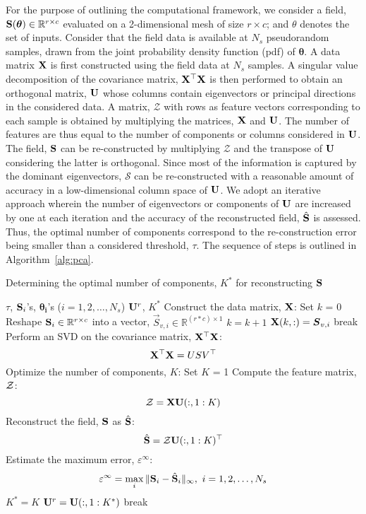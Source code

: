 For the purpose of outlining the computational framework, we consider a field,
$\mathbf{{S}}(\bm{\theta})\in\mathbb{R}^{r\times c}$ evaluated on a 2-dimensional mesh of size $r\times c$;
and $\theta$ denotes the set of inputs. Consider that the field data is available at $N_s$ pseudorandom
samples, drawn from the joint probability density function (pdf) of $\bm{\theta}$. A data matrix $\mathbf{{X}}$ is
first constructed using the field data at $N_s$ samples. A singular value decomposition of the covariance
matrix, $\mathbf{{X^\top X}}$ is then performed to obtain an orthogonal matrix, $\mathbf{{U}}$ whose columns 
contain eigenvectors or principal directions in the considered data. A matrix, $\mathcal{Z}$ with 
rows as feature vectors corresponding to each
sample is obtained by multiplying the matrices, $\mathbf{{X}}$ and $\mathbf{{U}}$. The number of features
are thus equal to the number of components or columns considered in $\mathbf{{U}}$. 
The field, $\mathbf{{S}}$ can be re-constructed by multiplying $\mathcal{Z}$ and the transpose of $\mathbf{{U}}$
considering the latter is orthogonal. 
Since most of the information is captured by the dominant eigenvectors, $\mathcal{S}$ can be re-constructed with a
reasonable amount of accuracy in a low-dimensional column space of $\mathbf{{U}}$. We adopt an iterative
approach wherein the number of eigenvectors or components of $\mathbf{{U}}$ are increased by one at each iteration
and the accuracy of the reconstructed field, $\hat{\mathbf{{S}}}$ is assessed. Thus, the optimal number of components
correspond to the re-construction error being smaller than a considered threshold, $\tau$. The sequence of steps
is outlined in Algorithm~\ref{alg:pca}.
%
\bigskip
\begin{breakablealgorithm}
\renewcommand{\algorithmicrequire}{\textbf{Input:}}
\renewcommand{\algorithmicensure}{\textbf{Output:}}
  \caption{Determining the optimal number of components, $K^\ast$ for reconstructing $\mathbf{{S}}$}
  \begin{algorithmic}[1]
  \Require $\tau$, $\mathbf{{S}}_i$'s, $\bm{\theta_i}$'s ($i=1,2,\ldots,N_s$)
  \Ensure $\mathbf{{U}}^r$, $K^\ast$
	\State Construct the data matrix, $\mathbf{{X}}$:
	\State Set $k$ = 0
	\Loop
	  \State Reshape $\mathbf{{S}}_i\in\mathbb{R}^{r\times c}$ into a vector,
	  $\vec{S}_{v,i}\in\mathbb{R}^{(r\ast c)\times 1}$
          \State $k=k+1$
	  \State $\mat X(k,:)=\vec{S}_{v,i}$
			\State break
		\EndIf
	\EndLoop
	\State Perform an SVD on the covariance matrix, $\mathbf{{X}}^\top \mathbf{{X}}$:
	\Statex \[ \mathbf{{X}}^\top \mathbf{{X}} = USV^\top \]
	\State Optimize the number of components, $K$:
	\State Set $K$ = 1
	\Loop
	 \State Compute the feature matrix, $\mathbf{{\mathcal{Z}}}$:
	  \[ \mathbf{{\mathcal{Z}}} = \mathbf{{X}}\mathbf{{U}}(:,1:K) \]
	  \State Reconstruct the field, $\mathbf{{S}}$ as $\hat{\mathbf{{S}}}$:
	  \[ \hat{\mathbf{{S}}} = \mathbf{{\mathcal{Z}}}\mathbf{{U}}(:,1:K)^\top \]
	  \State Estimate the maximum error, $\varepsilon^\infty$:
	  \[ \varepsilon^\infty = \max\limits_i \|\mathbf{{S}}_i-\hat{\mathbf{{S}}}_i\|_\infty,~i=1,2,\ldots,N_s\]
	   \If {$\varepsilon^\infty < \tau$}
	                \State $K^\ast = K$
	                \State $\mathbf{{U}}^r = \mathbf{{U}}(:,1:K^\ast)$
			\State break
		\EndIf
	\EndLoop
	\EndProcedure
  \end{algorithmic}
  \label{alg:pca}
\end{breakablealgorithm}
